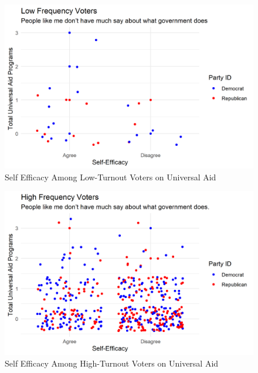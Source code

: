 \documentclass[12pt]{paper}
\begin{document}
\begin{figure}[H]
	\includegraphics[scale=0.7]{Figs/scatter_uni_efficacy_low.png} \centering
	\caption{Self Efficacy Among Low-Turnout Voters on Universal Aid}
	\label{}
\end{figure}

\begin{figure}[H]
	\includegraphics[scale=0.7]{Figs/scatter_uni_efficacy_high.png} \centering
	\caption{Self Efficacy Among High-Turnout Voters on Universal Aid}
	\label{}
\end{figure}
\end{document}
